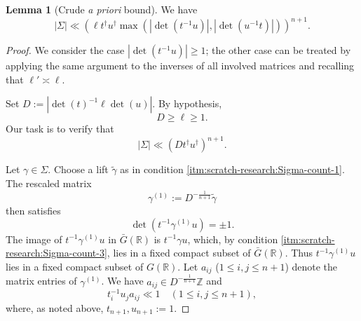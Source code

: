 \documentclass[reqno]{amsart}
\theoremstyle{plain} \newtheorem{theorem} {Theorem}
\theoremstyle{definition} \newtheorem{definition} [theorem] {Definition}
\theoremstyle{itplain} %
\newtheorem{lemma}[theorem]{Lemma}
\numberwithin{equation}{section}
\numberwithin{theorem}{section}
\renewcommand{\geq}{\geqslant}
\renewcommand{\leq}{\leqslant}
\begin{document}
\begin{lemma}[Crude \emph{a priori} bound]\label{lem:standard2:crude-a-priori-counting}
  We have
  \begin{equation*}
    |\Sigma| \ll
    \left( \ell t ^\dagger u ^\dagger \max(|\det(t^{-1} u)|, |\det(u^{-1} t)|) \right)^{n+1}.
  \end{equation*}
\end{lemma}
\begin{proof}
  We consider the case $|\det(t^{-1} u)| \geq 1$; the other case can be treated by applying the same argument to the inverses of all involved matrices and recalling that $\ell ' \asymp \ell$.

  Set $D := |\det(t)^{-1} \ell \det(u)|$.  By hypothesis,
  \begin{equation}\label{eq:d-geq-ell}
    D \geq \ell \geq 1.
  \end{equation}
  Our task is to verify that
  \begin{equation*}
    |\Sigma| \ll (D t ^\dagger u ^\dagger)^{n+1}.
  \end{equation*}

  Let $\gamma \in \Sigma$.  Choose a lift $\tilde{\gamma}$ as in condition \eqref{itm:scratch-research:Sigma-count-1}.  The rescaled matrix
  \begin{equation*}
    \gamma^{(1)} := D ^{- \frac{1}{n+1}} \tilde{\gamma }
  \end{equation*}
  then satisfies
  \begin{equation*}
    \det(t^{-1} \gamma^{(1)} u) = \pm 1.
  \end{equation*}
  The image of $t^{-1} \gamma^{(1)} u$ in $\bar{G}(\mathbb{R})$ is $t^{-1} \gamma u$, which, by condition \eqref{itm:scratch-research:Sigma-count-3}, lies in a fixed compact subset of $\bar{G}(\mathbb{R})$.  Thus $t^{-1} \gamma^{(1)} u$ lies in a fixed compact subset of $G(\mathbb{R})$.  Let $a_{i j}$ ($1 \leq i, j \leq n+1$) denote the matrix entries of $\gamma^{(1)}$.  We have $a_{i j} \in D^{- \frac{1}{n+1}} \mathbb{Z}$ and
  \begin{equation}\label{eq:r_i-1-s_j}
    t_i^{-1} u_j a_{i j} \ll 1
    \quad
    (1 \leq i, j \leq n+1),
  \end{equation}
  where, as noted above, $t_{n+1}, u_{n+1} := 1$.


\end{proof}
\end{document}
